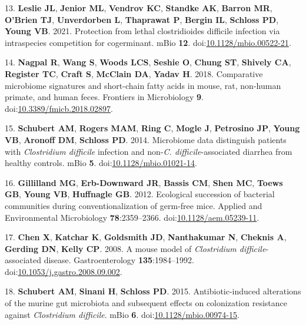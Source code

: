 \documentclass[
  12pt,
]{article}
\newenvironment{cslreferences}%
  {}%
  {\par}
\begin{document}
\begin{cslreferences}
\leavevmode\hypertarget{ref-Leslie2021}{}%
13. \textbf{Leslie JL}, \textbf{Jenior ML}, \textbf{Vendrov KC},
\textbf{Standke AK}, \textbf{Barron MR}, \textbf{O'Brien TJ},
\textbf{Unverdorben L}, \textbf{Thaprawat P}, \textbf{Bergin IL},
\textbf{Schloss PD}, \textbf{Young VB}. 2021. Protection from lethal
clostridioides difficile infection via intraspecies competition for
cogerminant. mBio \textbf{12}.
doi:\href{https://doi.org/10.1128/mbio.00522-21}{10.1128/mbio.00522-21}.

\leavevmode\hypertarget{ref-Nagpal2018}{}%
14. \textbf{Nagpal R}, \textbf{Wang S}, \textbf{Woods LCS},
\textbf{Seshie O}, \textbf{Chung ST}, \textbf{Shively CA},
\textbf{Register TC}, \textbf{Craft S}, \textbf{McClain DA},
\textbf{Yadav H}. 2018. Comparative microbiome signatures and
short-chain fatty acids in mouse, rat, non-human primate, and human
feces. Frontiers in Microbiology \textbf{9}.
doi:\href{https://doi.org/10.3389/fmicb.2018.02897}{10.3389/fmicb.2018.02897}.

\leavevmode\hypertarget{ref-Schubert2014}{}%
15. \textbf{Schubert AM}, \textbf{Rogers MAM}, \textbf{Ring C},
\textbf{Mogle J}, \textbf{Petrosino JP}, \textbf{Young VB},
\textbf{Aronoff DM}, \textbf{Schloss PD}. 2014. Microbiome data
distinguish patients with \emph{Clostridium difficile} infection and
non-\emph{C. difficile}-associated diarrhea from healthy controls. mBio
\textbf{5}.
doi:\href{https://doi.org/10.1128/mbio.01021-14}{10.1128/mbio.01021-14}.

\leavevmode\hypertarget{ref-Gillilland2012}{}%
16. \textbf{Gillilland MG}, \textbf{Erb-Downward JR}, \textbf{Bassis
CM}, \textbf{Shen MC}, \textbf{Toews GB}, \textbf{Young VB},
\textbf{Huffnagle GB}. 2012. Ecological succession of bacterial
communities during conventionalization of germ-free mice. Applied and
Environmental Microbiology \textbf{78}:2359--2366.
doi:\href{https://doi.org/10.1128/aem.05239-11}{10.1128/aem.05239-11}.

\leavevmode\hypertarget{ref-Chen2008}{}%
17. \textbf{Chen X}, \textbf{Katchar K}, \textbf{Goldsmith JD},
\textbf{Nanthakumar N}, \textbf{Cheknis A}, \textbf{Gerding DN},
\textbf{Kelly CP}. 2008. A mouse model of \emph{Clostridium
difficile}-associated disease. Gastroenterology \textbf{135}:1984--1992.
doi:\href{https://doi.org/10.1053/j.gastro.2008.09.002}{10.1053/j.gastro.2008.09.002}.

\leavevmode\hypertarget{ref-Schubert2015}{}%
18. \textbf{Schubert AM}, \textbf{Sinani H}, \textbf{Schloss PD}. 2015.
Antibiotic-induced alterations of the murine gut microbiota and
subsequent effects on colonization resistance against \emph{Clostridium
difficile}. mBio \textbf{6}.
doi:\href{https://doi.org/10.1128/mbio.00974-15}{10.1128/mbio.00974-15}.


\end{cslreferences}
\end{document}

